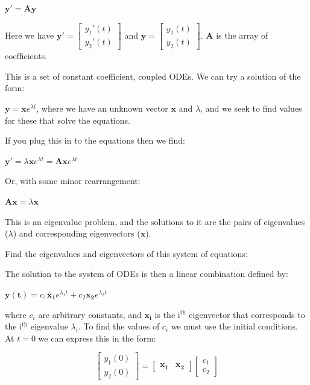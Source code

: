 \documentclass[11pt]{article}
\begin{document}
\(\mathbf{y'} = \mathbf{A} \mathbf{y}\)

Here we have \(\mathbf{y'} = \left[\begin{array}{c} y_1'(t) \\ y_2'(t)\end{array}\right]\) and \(\mathbf{y} = \left[\begin{array}{c} y_1(t) \\ y_2(t)\end{array}\right]\). \(\mathbf{A}\) is the array of coefficients.

This is a set of constant coefficient, coupled ODEs. We can try a solution of the form:

\(\mathbf{y} = \mathbf{x} e^{\lambda t}\), where we have an unknown vector \(\mathbf{x}\) and \(\lambda\), and we seek to find values for these that solve the equations.

If you plug this in to the equations then we find:

\(\mathbf{y'} = \lambda \mathbf{x} e^{\lambda t} = \mathbf{A} \mathbf{x} e^{\lambda t}\)

Or, with some minor rearrangement:

\(\mathbf{A} \mathbf{x} = \lambda \mathbf{x}\)

This is an eigenvalue problem, and the solutions to it are the pairs of eigenvalues (\(\lambda\)) and corresponding eigenvectors (\(\mathbf{x}\)).

Find the eigenvalues and eigenvectors of this system of equations:

The solution to the system of ODEs is then a linear combination defined by:

\(\mathbf{y(t)} = c_1 \mathbf{x_1} e^{\lambda_1 t} + c_2 \mathbf{x_2} e^{\lambda_2 t}\)

where \(c_i\) are arbitrary constants, and \(\mathbf{x_i}\) is the i\(^{\text{th}}\) eigenvector that corresponds to the i\(^{\text{th}}\) eigenvalue \(\lambda_i\). To find the values of \(c_i\) we must use the initial conditions. At \(t=0\) we can express this in the form:

\begin{equation}
\left[\begin{array}{c}y_1(0) \\ y_2(0)\end{array}\right]=
[\begin{array}{cc}\mathbf{x_1} & \mathbf{x_2}\end{array}]
\left[\begin{array}{c}c_1\\c_2\end{array}\right]
\end{equation}
\end{document}

